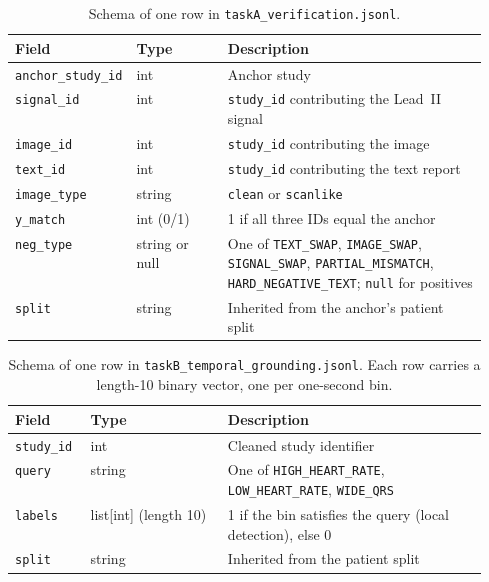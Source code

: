 \documentclass[12pt,letterpaper]{article}
\begin{document}
\begin{table}[!ht]
\centering
\caption{Schema of one row in \texttt{taskA\_verification.jsonl}.}
\label{tab:taskA_schema}
\renewcommand{\arraystretch}{1.2}
\begin{tabular}{l l p{0.55\linewidth}}
\toprule
Field & Type & Description \\
\midrule
\texttt{anchor\_study\_id} & int   & Anchor study \\
\texttt{signal\_id}        & int   & \texttt{study\_id} contributing the Lead~II signal \\
\texttt{image\_id}         & int   & \texttt{study\_id} contributing the image \\
\texttt{text\_id}          & int   & \texttt{study\_id} contributing the text report \\
\texttt{image\_type}       & string & \texttt{clean} or \texttt{scanlike} \\
\texttt{y\_match}          & int (0/1) & 1 if all three IDs equal the anchor \\
\texttt{neg\_type}         & string or null & One of \texttt{TEXT\_SWAP}, \texttt{IMAGE\_SWAP}, \texttt{SIGNAL\_SWAP}, \texttt{PARTIAL\_MISMATCH}, \texttt{HARD\_NEGATIVE\_TEXT}; \texttt{null} for positives \\
\texttt{split}             & string & Inherited from the anchor's patient split \\
\bottomrule
\end{tabular}
\end{table}

\begin{table}[!ht]
\centering
\caption{Schema of one row in \texttt{taskB\_temporal\_grounding.jsonl}. Each row carries a length-10 binary vector, one per one-second bin.}
\label{tab:taskB_schema}
\renewcommand{\arraystretch}{1.2}
\begin{tabular}{l l p{0.55\linewidth}}
\toprule
Field & Type & Description \\
\midrule
\texttt{study\_id} & int    & Cleaned study identifier \\
\texttt{query}     & string & One of \texttt{HIGH\_HEART\_RATE}, \texttt{LOW\_HEART\_RATE}, \texttt{WIDE\_QRS} \\
\texttt{labels}    & list[int] (length 10) & 1 if the bin satisfies the query (local detection), else 0 \\
\texttt{split}     & string & Inherited from the patient split \\
\bottomrule
\end{tabular}
\end{table}
\end{document}
